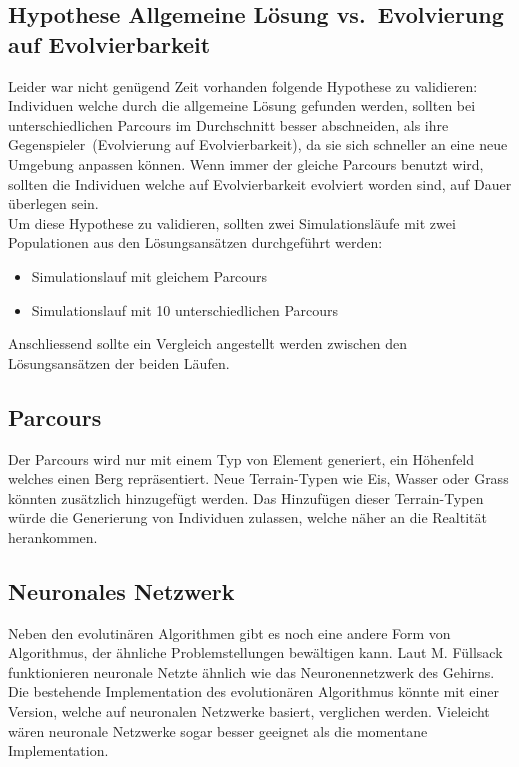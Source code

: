     \subsection{Hypothese Allgemeine Lösung vs.\ Evolvierung auf Evolvierbarkeit\label{sub:hypoAnsatz}}

      Leider war nicht genügend Zeit vorhanden folgende Hypothese zu validieren:
      Individuen welche durch die allgemeine Lösung gefunden werden,
      sollten bei unterschiedlichen Parcours im Durchschnitt besser abschneiden,
      als ihre Gegenspieler~(Evolvierung auf Evolvierbarkeit),
      da sie sich schneller an eine neue Umgebung anpassen können.
      Wenn immer der gleiche Parcours benutzt wird,
      sollten die Individuen welche auf Evolvierbarkeit evolviert worden sind, auf Dauer überlegen sein.
      \\
      Um diese Hypothese zu validieren,
      sollten zwei Simulationsläufe mit zwei Populationen aus den Lösungsansätzen durchgeführt werden:

      \begin{itemize}
        \item Simulationslauf mit gleichem Parcours
        \item Simulationslauf mit 10 unterschiedlichen Parcours
      \end{itemize}

      Anschliessend sollte ein Vergleich angestellt werden zwischen den Lösungsansätzen der beiden Läufen.

    \subsection{Parcours}

      Der Parcours wird nur mit einem Typ von Element generiert, ein Höhenfeld welches einen Berg repräsentiert.
      Neue Terrain-Typen wie Eis, Wasser oder Grass könnten zusätzlich hinzugefügt werden.
      Das Hinzufügen dieser Terrain-Typen würde die Generierung von Individuen zulassen, welche näher an die Realtität herankommen.


    \subsection{Neuronales Netzwerk}

      Neben den evolutinären Algorithmen gibt es noch eine andere Form von Algorithmus, der ähnliche Problemstellungen bewältigen kann.
      Laut M. Füllsack~\cite{book:fullsack} funktionieren neuronale Netzte ähnlich wie das Neuronennetzwerk des Gehirns.
      Die bestehende Implementation des evolutionären Algorithmus könnte mit einer Version, welche auf neuronalen Netzwerke basiert, verglichen werden.
      Vieleicht wären neuronale Netzwerke sogar besser geeignet als die momentane Implementation.
